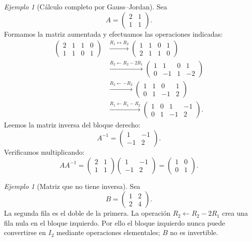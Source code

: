 \documentclass[12pt]{article}
\theoremstyle{remark}
\newtheorem{ejemplo}[definicion]{Ejemplo}
\begin{document}
\begin{ejemplo}[Cálculo completo por Gauss--Jordan]
Sea
\[
A=\begin{pmatrix}2&1\\1&1\end{pmatrix}.
\]
Formamos la matriz aumentada y efectuamos las operaciones indicadas:
\begin{align*}
\left(\begin{array}{cc|cc}2&1&1&0\\1&1&0&1\end{array}\right)
&\xrightarrow{R_1\leftrightarrow R_2}
\left(\begin{array}{cc|cc}1&1&0&1\\2&1&1&0\end{array}\right)\\[1ex]
&\xrightarrow{R_2\leftarrow R_2-2R_1}
\left(\begin{array}{cc|cc}1&1&0&1\\0&-1&1&-2\end{array}\right)\\[1ex]
&\xrightarrow{R_2\leftarrow -R_2}
\left(\begin{array}{cc|cc}1&1&0&1\\0&1&-1&2\end{array}\right)\\[1ex]
&\xrightarrow{R_1\leftarrow R_1-R_2}
\left(\begin{array}{cc|cc}1&0&1&-1\\0&1&-1&2\end{array}\right).
\end{align*}
Leemos la matriz inversa del bloque derecho:
\[
\boxed{A^{-1}=\begin{pmatrix}1&-1\\-1&2\end{pmatrix}.}
\]
Verificamos multiplicando:
\[
AA^{-1}=\begin{pmatrix}2&1\\1&1\end{pmatrix}
\begin{pmatrix}1&-1\\-1&2\end{pmatrix}
=\begin{pmatrix}1&0\\0&1\end{pmatrix}.
\]
\end{ejemplo}

\begin{ejemplo}[Matriz que no tiene inversa]
Sea
\[
B=\begin{pmatrix}1&2\\2&4\end{pmatrix}.
\]
La segunda fila es el doble de la primera. La operación $R_2\leftarrow R_2-2R_1$ crea una fila nula en el bloque izquierdo. Por ello el bloque izquierdo nunca puede convertirse en $I_2$ mediante operaciones elementales; $B$ no es invertible.
\end{ejemplo}
\end{document}
